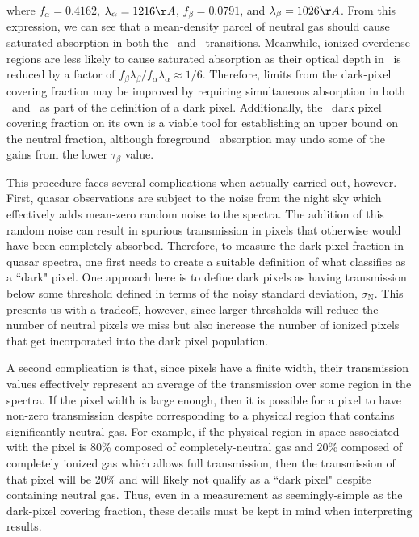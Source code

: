 where $f_{\alpha} = 0.4162$, $\lambda_{\alpha} = 1216 \AA$, $f_{\beta} = 0.0791$, and $\lambda_{\beta} = 1026\AA$. From this expression, we can see that a mean-density parcel of neutral gas should cause saturated absorption in both the \lya\ and \lyb\ transitions. Meanwhile, ionized overdense regions are less likely to cause saturated absorption as their optical depth in \lyb\ is reduced by a factor of $f_{\beta}\lambda_{\beta}/f_{\alpha}\lambda_{\alpha} \approx 1/6$. Therefore, limits from the dark-pixel covering fraction may be improved by requiring simultaneous absorption in both \lya\ and \lyb\ as part of the definition of a dark pixel. Additionally, the \lyb\ dark pixel covering fraction on its own is a viable tool for establishing an upper bound on the neutral fraction, although foreground \lya\ absorption may undo some of the gains from the lower $\tau_{\beta}$ value.

This procedure faces several complications when actually carried out, however. First, quasar observations are subject to the noise from the night sky which effectively adds mean-zero random noise to the spectra. The addition of this random noise can result in spurious transmission in pixels that otherwise would have been completely absorbed. Therefore, to measure the dark pixel fraction in quasar spectra, one first needs to create a suitable definition of what classifies as a ``dark" pixel. One approach here is to define dark pixels as having transmission below some threshold defined in terms of the noisy standard deviation, $\sigma_{\text{N}}$. This presents us with a tradeoff, however, since larger thresholds will reduce the number of neutral pixels we miss but also increase the number of ionized pixels that get incorporated into the dark pixel population.

A second complication is that, since pixels have a finite width, their transmission values effectively represent an average of the transmission over some region in the spectra. If the pixel width is large enough, then it is possible for a pixel to have non-zero transmission despite corresponding to a physical region that contains significantly-neutral gas. For example, if the physical region in space associated with the pixel is 80\% composed of completely-neutral gas and 20\% composed of completely ionized gas which allows full transmission, then the transmission of that pixel will be 20\% and will likely not qualify as a ``dark pixel" despite containing neutral gas. Thus, even in a measurement as seemingly-simple as the dark-pixel covering fraction, these details must be kept in mind when interpreting results.

